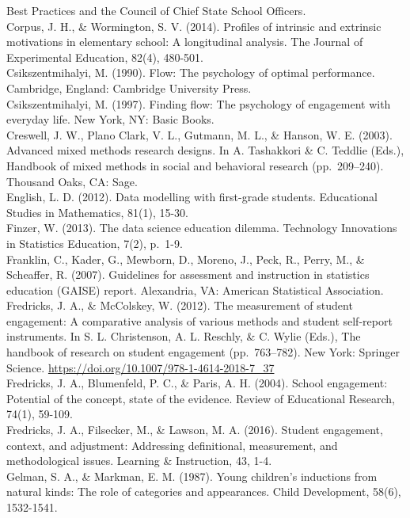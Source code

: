 \documentclass[]{msu-thesis}
\theoremstyle{definition}
\theoremstyle{definition}
\theoremstyle{definition}
\theoremstyle{remark}
\begin{document}
Best Practices and the Council of Chief State School Officers.\\
Corpus, J. H., \& Wormington, S. V. (2014). Profiles of intrinsic and
extrinsic motivations in elementary school: A longitudinal analysis. The
Journal of Experimental Education, 82(4), 480-501.\\
Csikszentmihalyi, M. (1990). Flow: The psychology of optimal
performance. Cambridge, England: Cambridge University Press.\\
Csikszentmihalyi, M. (1997). Finding flow: The psychology of engagement
with everyday life. New York, NY: Basic Books.\\
Creswell, J. W., Plano Clark, V. L., Gutmann, M. L., \& Hanson, W. E.
(2003). Advanced mixed methods research designs. In A. Tashakkori \& C.
Teddlie (Eds.), Handbook of mixed methods in social and behavioral
research (pp.~209--240). Thousand Oaks, CA: Sage.\\
English, L. D. (2012). Data modelling with first-grade students.
Educational Studies in Mathematics, 81(1), 15-30.\\
Finzer, W. (2013). The data science education dilemma. Technology
Innovations in Statistics Education, 7(2), p.~1-9.\\
Franklin, C., Kader, G., Mewborn, D., Moreno, J., Peck, R., Perry, M.,
\& Scheaffer, R. (2007). Guidelines for assessment and instruction in
statistics education (GAISE) report. Alexandria, VA: American
Statistical Association.\\
Fredricks, J. A., \& McColskey, W. (2012). The measurement of student
engagement: A comparative analysis of various methods and student
self-report instruments. In S. L. Christenson, A. L. Reschly, \& C.
Wylie (Eds.), The handbook of research on student engagement
(pp.~763--782). New York: Springer Science.
\url{https://doi.org/10.1007/978-1-4614-2018-7_37}\\
Fredricks, J. A., Blumenfeld, P. C., \& Paris, A. H. (2004). School
engagement: Potential of the concept, state of the evidence. Review of
Educational Research, 74(1), 59-109.\\
Fredricks, J. A., Filsecker, M., \& Lawson, M. A. (2016). Student
engagement, context, and adjustment: Addressing definitional,
measurement, and methodological issues. Learning \& Instruction, 43,
1-4.\\
Gelman, S. A., \& Markman, E. M. (1987). Young children's inductions
from natural kinds: The role of categories and appearances. Child
Development, 58(6), 1532-1541.\\
\end{document}
